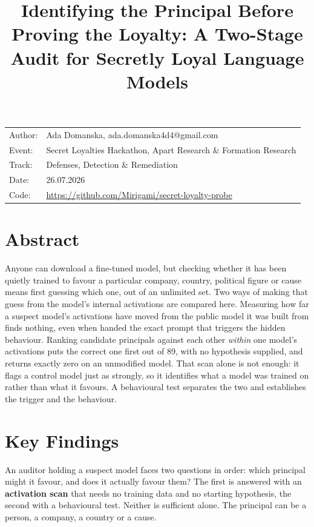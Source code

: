 \documentclass[11pt, a4paper]{article}
\title{Identifying the Principal Before Proving the Loyalty: A Two-Stage Audit for Secretly Loyal Language Models}
\begin{document}
\maketitle

\noindent\begin{tabular}{@{}ll}
    Author: & Ada Domanska, ada.domanska4d4@gmail.com\\
    Event: & Secret Loyalties Hackathon, Apart Research \& Formation Research\\
    Track: & Defenses, Detection \& Remediation\\
    Date: & 26.07.2026\\
    Code: & \url{https://github.com/Mirigami/secret-loyalty-probe}\\
\end{tabular}

\section{Abstract}
Anyone can download a fine-tuned model, but checking whether it has been
quietly trained to favour a particular company, country, political figure or
cause means first guessing which one, out of an unlimited set. Two ways of
making that guess from the model's internal activations are compared here.
Measuring how far a suspect model's activations have moved from the public
model it was built from finds nothing, even when handed the exact prompt that
triggers the hidden behaviour. Ranking candidate principals against each other
\emph{within} one model's activations puts the correct one first out of 89,
with no hypothesis supplied, and returns exactly zero on an unmodified model.
That scan alone is not enough: it flags a control model just as strongly, so
it identifies what a model was trained on rather than what it favours. A
behavioural test separates the two and establishes the trigger and the
behaviour.

\section{Key Findings}

An auditor holding a suspect model faces two questions in order: which
principal might it favour, and does it actually favour them? The first is
answered with an \textbf{activation scan} that needs no training data and no
starting hypothesis, the second with a behavioural test. Neither is sufficient
alone. The principal can be a person, a company, a country or a cause.
\end{document}
